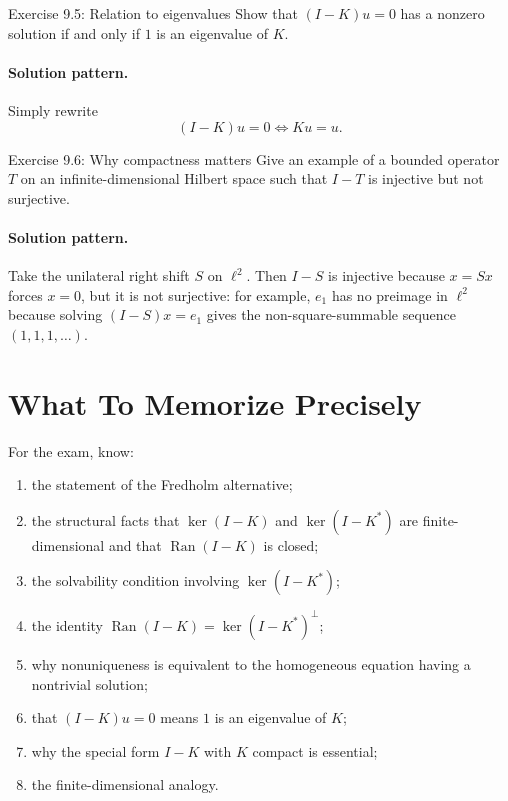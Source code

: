 \documentclass[header={Lecture 9 Exam Study Notes}]{study-note}
\begin{document}
\begin{exbox}{Exercise 9.5: Relation to eigenvalues}
Show that $(I-K)u=0$ has a nonzero solution if and only if $1$ is an eigenvalue of $K$.

\paragraph{Solution pattern.}
Simply rewrite
\[
(I-K)u=0
\iff
Ku=u.
\]
\end{exbox}

\begin{exbox}{Exercise 9.6: Why compactness matters}
Give an example of a bounded operator $T$ on an infinite-dimensional Hilbert space such that $I-T$ is injective but not surjective.

\paragraph{Solution pattern.}
Take the unilateral right shift $S$ on $\ell^2$. Then $I-S$ is injective because $x=Sx$ forces $x=0$, but it is not surjective: for example, $e_1$ has no preimage in $\ell^2$ because solving $(I-S)x=e_1$ gives the non-square-summable sequence $(1,1,1,\dots)$.
\end{exbox}

\section{What To Memorize Precisely}

\begin{focusbox}
For the exam, know:
\begin{enumerate}
\item the statement of the Fredholm alternative;
\item the structural facts that $\ker(I-K)$ and $\ker(I-K^*)$ are finite-dimensional and that $\operatorname{Ran}(I-K)$ is closed;
\item the solvability condition involving $\ker(I-K^*)$;
\item the identity $\operatorname{Ran}(I-K)=\ker(I-K^*)^{\perp}$;
\item why nonuniqueness is equivalent to the homogeneous equation having a nontrivial solution;
\item that $(I-K)u=0$ means $1$ is an eigenvalue of $K$;
\item why the special form $I-K$ with $K$ compact is essential;
\item the finite-dimensional analogy.
\end{enumerate}
\end{focusbox}
\end{document}
